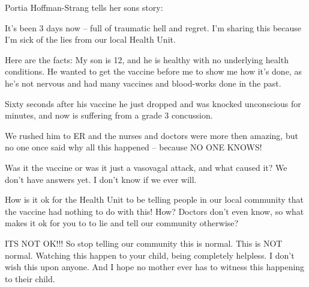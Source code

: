 Portia Hoffman-Strang tells her sons story:

It’s been 3 days now – full of traumatic hell and regret. I’m sharing this
because I’m sick of the lies from our local Health Unit.

Here are the facts: My son is 12, and he is healthy with no underlying health
conditions. He wanted to get the vaccine before me to show me how it’s done, as
he’s not nervous and had many vaccines and blood-works done in the past.

Sixty seconds after his vaccine he just dropped and was knocked unconscious for
minutes, and now is suffering from a grade 3 concussion.

We rushed him to ER and the nurses and doctors were more then amazing, but no
one once said why all this happened – because NO ONE KNOWS!

Was it the vaccine or was it just a vasovagal attack, and what caused it? We
don’t have answers yet. I don’t know if we ever will.

How is it ok for the Health Unit to be telling people in our local community
that the vaccine had nothing to do with this! How? Doctors don’t even know, so
what makes it ok for you to to lie and tell our community otherwise?

ITS NOT OK!!! So stop telling our community this is normal. This is NOT
normal. Watching this happen to your child, being completely helpless. I don’t
wish this upon anyone. And I hope no mother ever has to witness this happening
to their child.

